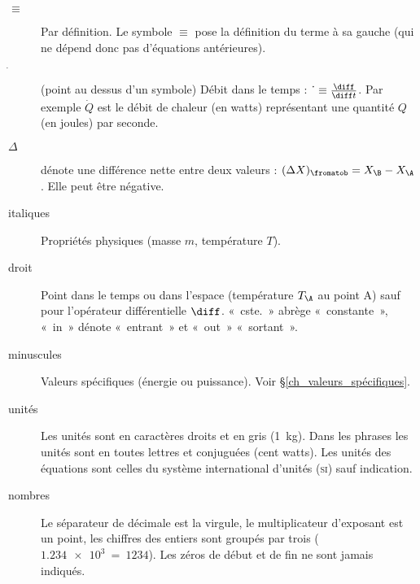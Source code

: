 
\TabPositions{2cm}
\begin{description}
	\item[$\equiv$] 	\tab Par définition. Le symbole $\equiv$ pose la définition du terme à sa gauche (qui ne dépend donc pas d’équations antérieures).
	\item[$\dot~$]		\tab (point au dessus d’un symbole) Débit dans le temps : $\dot~ \equiv \frac{\diff}{\diff t}$. Par exemple $\dot Q$ est le débit de chaleur (en \si{watts}) représentant une quantité $Q$ (en \si{joules}) par \si{seconde}.
	\item[$\Delta$]	\tab dénote une différence nette entre deux valeurs : $(\Delta X)_\fromatob = X_\B - X_\A$. Elle peut être négative.
	\item[italiques] 	Propriétés physiques (masse $m$, température $T$).
	\item[droit]		Point dans le temps ou dans l’espace (température $T_\A$ au point A) sauf pour l’opérateur différentielle $\diff$. «~cste.~» abrège «~constante~», «~in~» dénote «~entrant~» et «~out~» «~sortant~».
	\item[minuscules]	Valeurs spécifiques (énergie ou puissance). Voir \S\ref{ch_valeurs_spécifiques}.
	\item[unités]		Les unités sont en caractères droits et en gris (\SI{1}{\kilogram}). Dans les phrases les unités sont en toutes lettres et conjuguées (cent \si{watts}). Les unités des équations sont celles du système international d’unités (\textsc{si}) sauf indication.
	\item[nombres]		Le séparateur de décimale est la virgule, le multiplicateur d’exposant est un point, les chiffres des entiers sont groupés par trois ($\SI{1,234e3} ~=~ \num{1234}$). Les zéros de début et de fin ne sont jamais indiqués.
\end{description}
